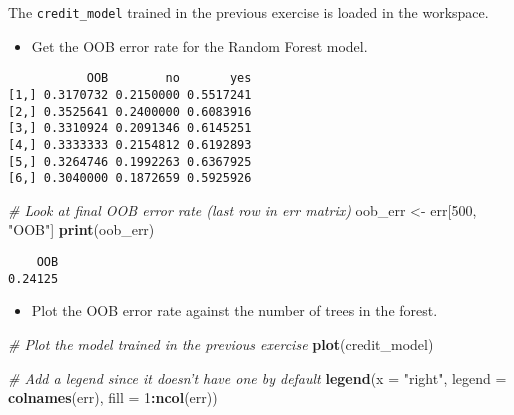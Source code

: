 \documentclass[
]{book}
\newenvironment{Shaded}{\begin{snugshade}}{\end{snugshade}}
\newcommand{\CommentTok}[1]{\textcolor[rgb]{0.56,0.35,0.01}{\textit{#1}}}
\newcommand{\DataTypeTok}[1]{\textcolor[rgb]{0.13,0.29,0.53}{#1}}
\newcommand{\DecValTok}[1]{\textcolor[rgb]{0.00,0.00,0.81}{#1}}
\newcommand{\KeywordTok}[1]{\textcolor[rgb]{0.13,0.29,0.53}{\textbf{#1}}}
\newcommand{\NormalTok}[1]{#1}
\newcommand{\OperatorTok}[1]{\textcolor[rgb]{0.81,0.36,0.00}{\textbf{#1}}}
\newcommand{\StringTok}[1]{\textcolor[rgb]{0.31,0.60,0.02}{#1}}
\providecommand{\tightlist}{%
  \setlength{\itemsep}{0pt}\setlength{\parskip}{0pt}}
\begin{document}
The \texttt{credit\_model} trained in the previous exercise is loaded in the workspace.

\begin{itemize}
\tightlist
\item
  Get the OOB error rate for the Random Forest model.
\end{itemize}

\begin{Shaded}
\end{Shaded}

\begin{verbatim}
           OOB        no       yes
[1,] 0.3170732 0.2150000 0.5517241
[2,] 0.3525641 0.2400000 0.6083916
[3,] 0.3310924 0.2091346 0.6145251
[4,] 0.3333333 0.2154812 0.6192893
[5,] 0.3264746 0.1992263 0.6367925
[6,] 0.3040000 0.1872659 0.5925926
\end{verbatim}

\begin{Shaded}
\begin{Highlighting}[]
\CommentTok{# Look at final OOB error rate (last row in err matrix)}
\NormalTok{oob_err <-}\StringTok{ }\NormalTok{err[}\DecValTok{500}\NormalTok{, }\StringTok{"OOB"}\NormalTok{]}
\KeywordTok{print}\NormalTok{(oob_err)}
\end{Highlighting}
\end{Shaded}

\begin{verbatim}
    OOB 
0.24125 
\end{verbatim}

\begin{itemize}
\tightlist
\item
  Plot the OOB error rate against the number of trees in the forest.
\end{itemize}

\begin{Shaded}
\begin{Highlighting}[]
\CommentTok{# Plot the model trained in the previous exercise}
\KeywordTok{plot}\NormalTok{(credit_model)}

\CommentTok{# Add a legend since it doesn't have one by default}
\KeywordTok{legend}\NormalTok{(}\DataTypeTok{x =} \StringTok{"right"}\NormalTok{, }
       \DataTypeTok{legend =} \KeywordTok{colnames}\NormalTok{(err),}
       \DataTypeTok{fill =} \DecValTok{1}\OperatorTok{:}\KeywordTok{ncol}\NormalTok{(err))}
\end{Highlighting}
\end{Shaded}
\end{document}

